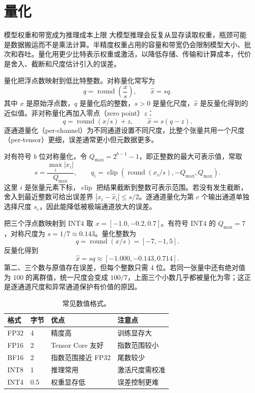 \section{量化}
\label{sec:quantization}

\begin{motivationbox}{模型权重和带宽成为推理成本上限}
大模型推理会反复从显存读取权重，瓶颈可能是数据搬运而不是乘法计算。半精度权重占用的容量和带宽仍会限制模型大小、批次和吞吐。量化用更少比特表示权重或激活，以降低存储、传输和计算成本，代价是舍入、截断和尺度估计引入的误差。
\end{motivationbox}

量化把浮点数映射到低比特整数。对称量化常写为
\[
q=\operatorname{round}\left(\frac{x}{s}\right),\qquad \hat x=sq.
\]
其中 $x$ 是原始浮点数，$q$ 是量化后的整数，$s>0$ 是量化尺度，$\hat x$ 是反量化得到的近似值。非对称量化再加入零点（zero point）$z$：
\[
q=\operatorname{round}(x/s)+z,\qquad \hat x=s(q-z).
\]
逐通道量化（per-channel）为不同通道设置不同尺度，比整个张量共用一个尺度（per-tensor）更细，误差通常更小但元数据更多。

对有符号 $b$ 位对称量化，令 $Q_{\max}=2^{b-1}-1$，即正整数的最大可表示值，常取
\[
s=\frac{\max_i|x_i|}{Q_{\max}},\qquad
q_i=\operatorname{clip}\!\left(\operatorname{round}(x_i/s),-Q_{\max},Q_{\max}\right).
\]
这里 $i$ 是张量元素下标，$\operatorname{clip}$ 把结果截断到整数可表示范围。若没有发生截断，舍入到最近整数可给出误差界 $|x_i-\hat x_i|\le s/2$。逐通道量化为第 $c$ 个输出通道单独选择尺度 $s_c$，因此能降低被极端通道放大的误差。

\begin{examplebox}{把三个浮点数映射到 INT4}
取 $x=[-1.0,-0.2,0.7]$。有符号 INT4 的 $Q_{\max}=7$，对称尺度为 $s=1/7\approx0.143$。量化整数为
\[
q=\operatorname{round}(x/s)=[-7,-1,5].
\]
反量化得到
\[
\hat x=sq\approx[-1.000,-0.143,0.714].
\]
第二、三个数与原值存在误差，但每个整数只需 4 位。若同一张量中还有绝对值为 $100$ 的离群值，统一尺度会变成 $100/7$，上面三个小数几乎都被量化为零；这正是逐通道尺度和异常通道保护有价值的原因。
\end{examplebox}

\begin{table}[htbp]
\centering
\small
\begin{tabularx}{0.86\textwidth}{lYYY}
\toprule
格式 & 字节 & 优点 & 注意点\\
\midrule
FP32 & 4 & 精度高 & 训练显存大\\
FP16 & 2 & Tensor Core 友好 & 指数范围较小\\
BF16 & 2 & 指数范围接近 FP32 & 尾数较少\\
INT8 & 1 & 推理常用 & 激活尺度需校准\\
INT4 & 0.5 & 权重显存低 & 误差控制更难\\
\bottomrule
\end{tabularx}
\caption{常见数值格式。}
\end{table}

